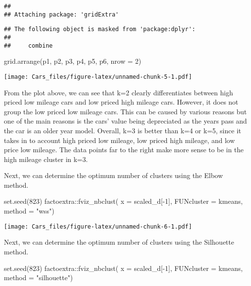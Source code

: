 \documentclass[
]{article}
\newenvironment{Shaded}{\begin{snugshade}}{\end{snugshade}}
\newcommand{\AttributeTok}[1]{\textcolor[rgb]{0.77,0.63,0.00}{#1}}
\newcommand{\DecValTok}[1]{\textcolor[rgb]{0.00,0.00,0.81}{#1}}
\newcommand{\FunctionTok}[1]{\textcolor[rgb]{0.00,0.00,0.00}{#1}}
\newcommand{\NormalTok}[1]{#1}
\newcommand{\SpecialCharTok}[1]{\textcolor[rgb]{0.00,0.00,0.00}{#1}}
\newcommand{\StringTok}[1]{\textcolor[rgb]{0.31,0.60,0.02}{#1}}
\begin{document}
\begin{verbatim}
## 
## Attaching package: 'gridExtra'
\end{verbatim}

\begin{verbatim}
## The following object is masked from 'package:dplyr':
## 
##     combine
\end{verbatim}

\begin{Shaded}
\begin{Highlighting}[]
\FunctionTok{grid.arrange}\NormalTok{(p1, p2, p3, p4, p5, p6, }\AttributeTok{nrow =} \DecValTok{2}\NormalTok{)}
\end{Highlighting}
\end{Shaded}

\texttt{[image: Cars\_files/figure-latex/unnamed-chunk-5-1.pdf]}

From the plot above, we can see that k=2 clearly differentiates between
high priced low mileage cars and low priced high mileage cars. However,
it does not group the low priced low mileage cars. This can be caused by
various reasons but one of the main reasons is the cars' value being
depreciated as the years pass and the car is an older year model.
Overall, k=3 is better than k=4 or k=5, since it takes in to account
high priced low mileage, low priced high mileage, and low price low
mileage. The data points far to the right make more sense to be in the
high mileage cluster in k=3.

Next, we can determine the optimum number of clusters using the Elbow
method.

\begin{Shaded}
\begin{Highlighting}[]
\FunctionTok{set.seed}\NormalTok{(}\DecValTok{823}\NormalTok{)}
\NormalTok{factoextra}\SpecialCharTok{::}\FunctionTok{fviz\_nbclust}\NormalTok{(}
  \AttributeTok{x =}\NormalTok{ scaled\_d[}\SpecialCharTok{{-}}\DecValTok{1}\NormalTok{],}
  \AttributeTok{FUNcluster =}\NormalTok{ kmeans,}
  \AttributeTok{method =} \StringTok{"wss"}\NormalTok{)}
\end{Highlighting}
\end{Shaded}

\texttt{[image: Cars\_files/figure-latex/unnamed-chunk-6-1.pdf]}

Next, we can determine the optimum number of clusters using the
Silhouette method.

\begin{Shaded}
\begin{Highlighting}[]
\FunctionTok{set.seed}\NormalTok{(}\DecValTok{823}\NormalTok{)}
\NormalTok{factoextra}\SpecialCharTok{::}\FunctionTok{fviz\_nbclust}\NormalTok{(}
  \AttributeTok{x =}\NormalTok{ scaled\_d[}\SpecialCharTok{{-}}\DecValTok{1}\NormalTok{],}
  \AttributeTok{FUNcluster =}\NormalTok{ kmeans,}
  \AttributeTok{method =} \StringTok{"silhouette"}\NormalTok{)}
\end{Highlighting}
\end{Shaded}
\end{document}
